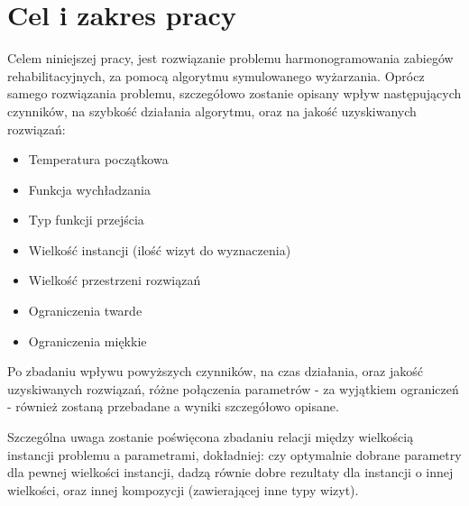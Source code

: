 \chapter{Cel i zakres pracy} Celem niniejszej pracy, jest rozwiązanie problemu
harmonogramowania zabiegów rehabilitacyjnych, za pomocą algorytmu symulowanego
wyżarzania. Oprócz samego rozwiązania problemu, szczegółowo zostanie opisany
wpływ następujących czynników, na szybkość działania algorytmu, oraz na jakość
uzyskiwanych rozwiązań:

\begin{itemize} \item Temperatura początkowa \item Funkcja wychładzania \item
	Typ funkcji przejścia \item Wielkość instancji (ilość wizyt do
	wyznaczenia) \item Wielkość przestrzeni rozwiązań \item Ograniczenia
	twarde \item Ograniczenia miękkie \end{itemize} Po zbadaniu wpływu
	powyższych czynników, na czas działania, oraz jakość uzyskiwanych rozwiązań,
	różne połączenia parametrów - za wyjątkiem ograniczeń - również zostaną
	przebadane a wyniki szczegółowo opisane.

Szczególna uwaga zostanie poświęcona zbadaniu relacji między wielkością
instancji problemu a parametrami, dokładniej: czy optymalnie dobrane parametry
dla pewnej wielkości instancji, dadzą równie dobre rezultaty dla instancji o
innej wielkości, oraz innej kompozycji (zawierającej inne typy wizyt).
